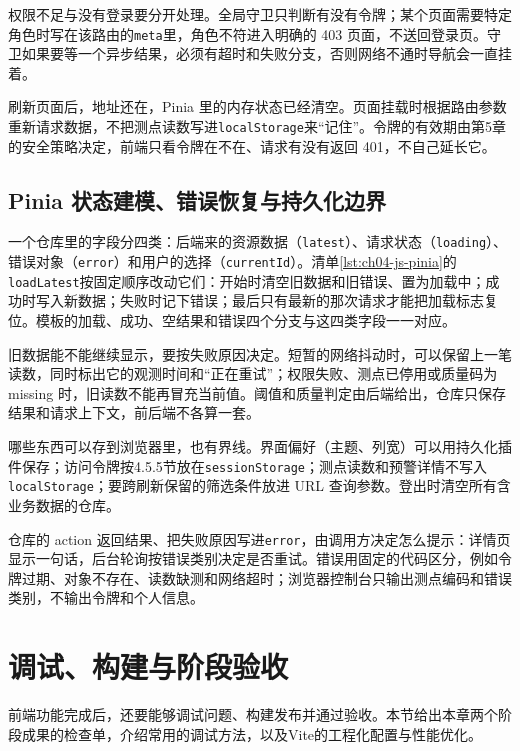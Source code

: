 权限不足与没有登录要分开处理。全局守卫只判断有没有令牌；某个页面需要特定角色时写在该路由的\texttt{meta}里，角色不符进入明确的 403 页面，不送回登录页。守卫如果要等一个异步结果，必须有超时和失败分支，否则网络不通时导航会一直挂着。

刷新页面后，地址还在，Pinia 里的内存状态已经清空。页面挂载时根据路由参数重新请求数据，不把测点读数写进\texttt{localStorage}来“记住”。令牌的有效期由第5章的安全策略决定，前端只看令牌在不在、请求有没有返回 401，不自己延长它。

\subsection{Pinia 状态建模、错误恢复与持久化边界}

一个仓库里的字段分四类：后端来的资源数据（\texttt{latest}）、请求状态（\texttt{loading}）、错误对象（\texttt{error}）和用户的选择（\texttt{currentId}）。清单\ref{lst:ch04-js-pinia}的\texttt{loadLatest}按固定顺序改动它们：开始时清空旧数据和旧错误、置为加载中；成功时写入新数据；失败时记下错误；最后只有最新的那次请求才能把加载标志复位。模板的加载、成功、空结果和错误四个分支与这四类字段一一对应。

旧数据能不能继续显示，要按失败原因决定。短暂的网络抖动时，可以保留上一笔读数，同时标出它的观测时间和“正在重试”；权限失败、测点已停用或质量码为 missing 时，旧读数不能再冒充当前值。阈值和质量判定由后端给出，仓库只保存结果和请求上下文，前后端不各算一套。

哪些东西可以存到浏览器里，也有界线。界面偏好（主题、列宽）可以用持久化插件保存；访问令牌按4.5.5节放在\texttt{sessionStorage}；测点读数和预警详情不写入\texttt{localStorage}；要跨刷新保留的筛选条件放进 URL 查询参数。登出时清空所有含业务数据的仓库。

仓库的 action 返回结果、把失败原因写进\texttt{error}，由调用方决定怎么提示：详情页显示一句话，后台轮询按错误类别决定是否重试。错误用固定的代码区分，例如令牌过期、对象不存在、读数缺测和网络超时；浏览器控制台只输出测点编码和错误类别，不输出令牌和个人信息。

\section{调试、构建与阶段验收}\label{sec:ch04-stage-acceptance}

前端功能完成后，还要能够调试问题、构建发布并通过验收。本节给出本章两个阶段成果的检查单，介绍常用的调试方法，以及Vite的工程化配置与性能优化。

